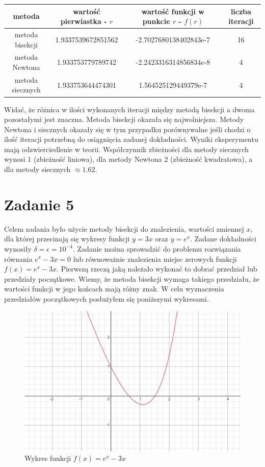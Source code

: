 \documentclass[]{article}
\begin{document}
	\begin{table}[h!]
		\centering
		\label{tab:table1}
		\begin{tabular}{|c|c|c|c|}
			\hline
			metoda & wartość pierwiastka - $r$ & wartość funkcji w punkcie $r$ - $f(r)$ & liczba iteracji \\ \hline
			metoda bisekcji & 1.9337539672851562 & -2.7027680138402843e-7 & 16 \\ \hline
			metoda Newtona & 1.933753779789742 & -2.2423316314856834e-8 & 4 \\ \hline
			metoda siecznych & 1.933753644474301 & 1.564525129449379e-7 & 4 \\ \hline
		\end{tabular}
	\end{table}
	
	Widać, że różnica w ilości wykonanych iteracji między metodą bisekcji a dwoma pozostałymi jest znaczna. Metoda bisekcji okazała się najwolniejsza. Metody Newtona i siecznych okazały się w tym przypadku porównywalne jeśli chodzi o ilość iteracji potrzebną do osiągnięcia zadanej dokładności. Wyniki eksperymentu mają odzwierciedlenie w teorii. Współczynnik zbieżności dla metody siecznych wynosi $1$ (zbieżność liniowa), dla metody Newtona $2$ (zbieżność kwadratowa), a dla metody siecznych $\approx1.62$.
	
	\clearpage
	
	\section*{Zadanie 5}
	Celem zadania było użycie metody bisekcji do znalezienia, wartości zmiennej $x$, dla której przecinają się wykresy funkcji $y=3x$ oraz $y=e^x$. Zadane dokładności wynosiły $\delta = \epsilon = 10^{-4}$. Zadanie można sprowadzić do problemu rozwiązania równania $e^x - 3x = 0$ lub równoważnie znalezienia miejsc zerowych funkcji $f(x) = e^x - 3x$. Pierwszą rzeczą jaką należało wykonać to dobrać przedział lub przedziały początkowe. Wiemy, że metoda bisekcji wymaga takiego przedziału, że wartości funkcji w jego końcach mają różny znak. W celu wyznaczenia przedziałów początkowych posłużyłem się poniższymi wykresami.
	
	\begin{figure}[!htbp]
		\includegraphics[width=\textwidth]{task5plot}
		\centering
		\caption{Wykres funkcji $f(x) = e^x - 3x$}
	\end{figure}
	
\end{document}

